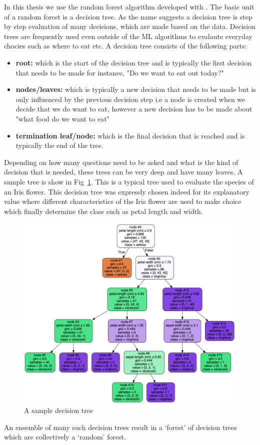 In this thesis we use the random forest algorithm developed with \citep[scikit-learn, ][]{2011JRFsklearn}.
The basic unit of a random forest is a decision tree.
As the name suggests a decision tree is step by step evaluation of many decisions, which are made based on the data.
Decision trees are frequently used even outside of the ML algorithms to evalaute everyday chocies such as where to eat etc.
A decision tree consists of the following parts:
\begin{itemize}
    \item \textbf{root:} which is the start of the decision tree and is typically the first decision that needs to be made for instance, "Do we want to eat out today?"
    \item\textbf{nodes/leaves:} which is typically a new decision that needs to be made but is only influenced by the previous decision step i.e a node is created when we decide that we do want to eat, however a new decision has to be made about "what food do we want to eat"
    \item \textbf{termination leaf/node:} which is the final decision that is reached and is typically the end of the tree.
\end{itemize}
Depending on how many questions need to be asked and what is the kind of decision that is needed, these trees can be very deep and have many leaves.
A sample tree is show in Fig~\ref{fig:dt}.
This is a typical tree used to evaluate the species of an Iris flower.
This decision tree was expressly chosen indeed for its explanatory value where different characteristics of the Iris flower are used to make choice which finally determine the class such as petal length and width.
\begin{figure}
    \centering
    \includegraphics[scale =0.5]{images/Chapter3/decision_tree_model-2609977862.png}
    \caption{A sample decision tree}
    \label{fig:dt}
\end{figure}
An ensemble of many such decision trees result in a `forest' of decision trees which are collectively a `random' forest.

